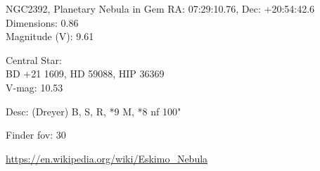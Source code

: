 \begin{block}{NGC2392, Planetary Nebula in Gem}
    RA: 07:29:10.76, Dec: +20:54:42.6 \\ 
    Dimensions: 0.86 \\ 
    Magnitude (V): 9.61

    Central Star: \\ 
      \hspace{1em}BD +21 1609, HD 59088, HIP 36369 \\ 
      \hspace{1em}V-mag: 10.53 

    Desc: (Dreyer) B, S, R, *9 M, *8 nf 100" 

    Finder fov: 30 

    \url{https://en.wikipedia.org/wiki/Eskimo_Nebula} 
\end{block}